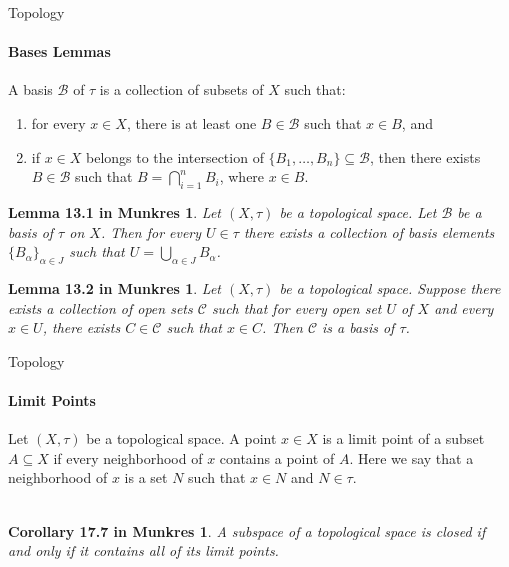 \documentclass[pdf]{beamer}
\begin{document}
    \begin{frame}{Topology}
        \framesubtitle{Bases Lemmas}
        \newtheorem{lemma:13.1}{Lemma 13.1 in Munkres}
        \newtheorem{lemma:13.2}{Lemma 13.2 in Munkres}

        A {\color{red} basis} $\mathcal{B}$ of $\tau$ is a collection of subsets of $X$ such that:

        \begin{enumerate}
            \item for every $x \in X$, there is at least one $B \in \mathcal{B}$ such that $x \in B$, and
            \item if $x \in X$ belongs to the intersection of $\{B_1, \hdots, B_n \} \subseteq \mathcal{B}$, 
                  then there exists $B \in \mathcal{B}$ such that $B = \bigcap_{i = 1}^n B_i$, where $x \in B$.
        \end{enumerate}

        \begin{lemma:13.1}
            Let $(X, \tau)$ be a topological space. Let $\mathcal{B}$ be a basis of $\tau$
            on $X$. Then for every $U \in \tau$ there exists a collection of basis elements
            $\{B_\alpha\}_{\alpha \in J}$ such that $U = \bigcup_{\alpha \in J} B_\alpha$.
        \end{lemma:13.1}
        \begin{lemma:13.2}
            Let $(X, \tau)$ be a topological space. Suppose there exists a collection
            of open sets $\mathcal{C} $ such that for every open set $U$ of $X$ and 
            every $x \in U$, there exists $C \in \mathcal{C}$ such that $x \in C$. Then
            $\mathcal{C}$ is a basis of $\tau$.
        \end{lemma:13.2}

    \end{frame}

    \begin{frame}{Topology}
        \framesubtitle{Limit Points}
        \newtheorem{cor:17.7}{Corollary 17.7 in Munkres}

        Let $(X, \tau)$ be a topological space. A point $x \in X$ is a {\color{red} limit point}
        of a subset $A \subseteq X$ if every neighborhood of $x$ contains a point of $A$. Here 
        we say that a neighborhood of $x$ is a set $N$ such that $x \in N$ and $N \in \tau$. \\~\\

        \begin{cor:17.7}
            A subspace of a topological space is closed if and only if it contains all of its limit points.
        \end{cor:17.7}

    \end{frame}
\end{document}
